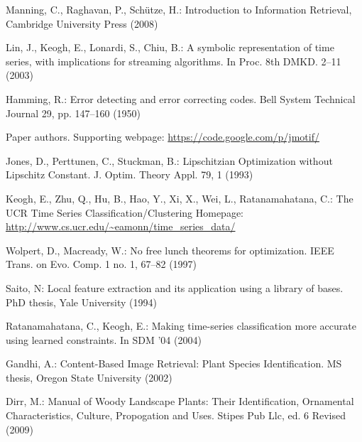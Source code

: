 \documentclass[conference]{IEEEtran}
\begin{document}
\begin{thebibliography}{5}

Manning, C., Raghavan, P., Sch\"utze, H.: 
Introduction to Information Retrieval, Cambridge University Press (2008)

Lin, J., Keogh, E., Lonardi, S., Chiu, B.:
A symbolic representation of time series, with implications for streaming algorithms. 
In Proc. 8th DMKD. 2--11 (2003)

Hamming, R.:
Error detecting and error correcting codes. 
Bell System Technical Journal 29, pp. 147--160 (1950)

Paper authors. Supporting webpage:
\url{https://code.google.com/p/jmotif/}

Jones, D., Perttunen, C., Stuckman, B.:
Lipschitzian Optimization without Lipschitz Constant.
J. Optim. Theory Appl. 79, 1 (1993)

Keogh, E., Zhu, Q., Hu, B., Hao, Y.,  Xi, X., Wei, L., Ratanamahatana, C.:
The UCR Time Series Classification/Clustering Homepage:
\url{http://www.cs.ucr.edu/~eamonn/time_series_data/}


Wolpert, D., Macready, W.:
No free lunch theorems for optimization.
IEEE Trans. on Evo. Comp. 1 no. 1, 67--82 (1997)

Saito, N:
Local feature extraction and its application using a library of bases. 
PhD thesis, Yale University (1994)


Ratanamahatana, C., Keogh, E.:
Making time-series classification more accurate using learned constraints. 
In SDM '04 (2004)

Gandhi, A.:
Content-Based Image Retrieval: Plant Species Identification. 
MS thesis, Oregon State University (2002)

Dirr, M.:
Manual of Woody Landscape Plants: Their Identification, Ornamental Characteristics,
Culture, Propogation and Uses.
Stipes Pub Llc, ed. 6 Revised (2009)


\end{thebibliography}
\end{document}
